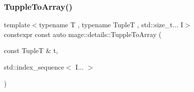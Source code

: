 \mbox{\label{namespacemage_1_1details_a32537621c79324893f0671ae2124a365}} 
\subsubsection{\texorpdfstring{Tupple\+To\+Array()}{TuppleToArray()}}
{\footnotesize\ttfamily template$<$typename T , typename TupleT , std\+::size\+\_\+t... I$>$ \\
constexpr const auto mage\+::details\+::\+Tupple\+To\+Array (\begin{DoxyParamCaption}\item[{const TupleT \&}]{t,  }\item[{std\+::index\+\_\+sequence$<$ I... $>$}]{ }\end{DoxyParamCaption})}

